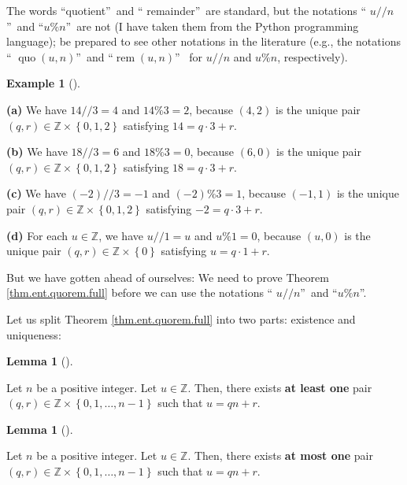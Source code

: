 \documentclass[numbers=enddot,12pt,final,onecolumn,notitlepage]{scrartcl}%
\numberwithin{exer}{subsection}
\theoremstyle{definition}
\newtheorem{lem}[theo]{Lemma}
\newenvironment{lemma}[1][]
{\begin{lem}[#1]\begin{leftbar}}
{\end{leftbar}\end{lem}}
\newtheorem{exam}[theo]{Example}
\newenvironment{example}[1][]
{\begin{exam}[#1]\begin{leftbar}}
{\end{leftbar}\end{exam}}
\begin{document}
The words \textquotedblleft quotient\textquotedblright\ and \textquotedblleft
remainder\textquotedblright\ are standard, but the notations \textquotedblleft%
$u//n$\textquotedblright\ and \textquotedblleft$u\%n$\textquotedblright\ are
not (I have taken them from the Python programming language); be prepared to
see other notations in the literature (e.g., the notations \textquotedblleft%
$\operatorname*{quo}\left(  u,n\right)  $\textquotedblright\ and
\textquotedblleft$\operatorname*{rem}\left(  u,n\right)  $\textquotedblright%
\ for $u//n$ and $u\%n$, respectively).

\begin{example}
\textbf{(a)} We have $14//3=4$ and $14\%3=2$, because $\left(  4,2\right)  $
is the unique pair $\left(  q,r\right)  \in\mathbb{Z}\times\left\{
0,1,2\right\}  $ satisfying $14=q\cdot3+r$.

\textbf{(b)} We have $18//3=6$ and $18\%3=0$, because $\left(  6,0\right)  $
is the unique pair $\left(  q,r\right)  \in\mathbb{Z}\times\left\{
0,1,2\right\}  $ satisfying $18=q\cdot3+r$.

\textbf{(c)} We have $\left(  -2\right)  //3=-1$ and $\left(  -2\right)
\%3=1$, because $\left(  -1,1\right)  $ is the unique pair $\left(
q,r\right)  \in\mathbb{Z}\times\left\{  0,1,2\right\}  $ satisfying
$-2=q\cdot3+r$.

\textbf{(d)} For each $u\in\mathbb{Z}$, we have $u//1=u$ and $u\%1=0$, because
$\left(  u,0\right)  $ is the unique pair $\left(  q,r\right)  \in
\mathbb{Z}\times\left\{  0\right\}  $ satisfying $u=q\cdot1+r$.
\end{example}

But we have gotten ahead of ourselves: We need to prove Theorem
\ref{thm.ent.quorem.full} before we can use the notations \textquotedblleft%
$u//n$\textquotedblright\ and \textquotedblleft$u\%n$\textquotedblright.

Let us split Theorem \ref{thm.ent.quorem.full} into two parts: existence and uniqueness:

\begin{lemma}
\label{lem.ent.quorem.exist}Let $n$ be a positive integer. Let $u\in
\mathbb{Z}$. Then, there exists \textbf{at least one} pair $\left(
q,r\right)  \in\mathbb{Z}\times\left\{  0,1,\ldots,n-1\right\}  $ such that
$u=qn+r$.
\end{lemma}

\begin{lemma}
\label{lem.ent.quorem.unique}Let $n$ be a positive integer. Let $u\in
\mathbb{Z}$. Then, there exists \textbf{at most one} pair $\left(  q,r\right)
\in\mathbb{Z}\times\left\{  0,1,\ldots,n-1\right\}  $ such that $u=qn+r$.
\end{lemma}
\end{document}

